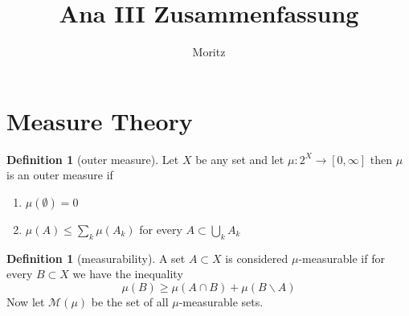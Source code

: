 \documentclass[11pt,a4paper]{article}
\title{\textbf{Ana III Zusammenfassung}}
\author{Moritz}
\newcommand{\cM}{\mathcal{M}}
\theoremstyle{plain}
\theoremstyle{definition}
\newtheorem{definition}[theorem]{Definition}
\begin{document}
\maketitle

\section{Measure Theory}
\begin{definition}[outer measure]
    Let $X$ be any set and let $\mu: 2^X \to [0, \infty]$ then $\mu$ is an 
    outer measure if
    \begin{enumerate}
        \item $\mu(\emptyset) = 0$
        \item $\mu(A) \le \sum_k \mu(A_k)$ \quad for every $A \subset \bigcup_k A_k$
    \end{enumerate}
\end{definition}

\begin{definition}[measurability]
    A set $A \subset X$ is considered $\mu$-measurable if for every $B \subset X$ we have 
    the inequality
    \[
        \mu(B) \ge \mu(A \cap B) + \mu (B \backslash A)
    \]
    Now let $\cM(\mu)$ be the set of all $\mu$-measurable sets.
\end{definition}
\end{document}
